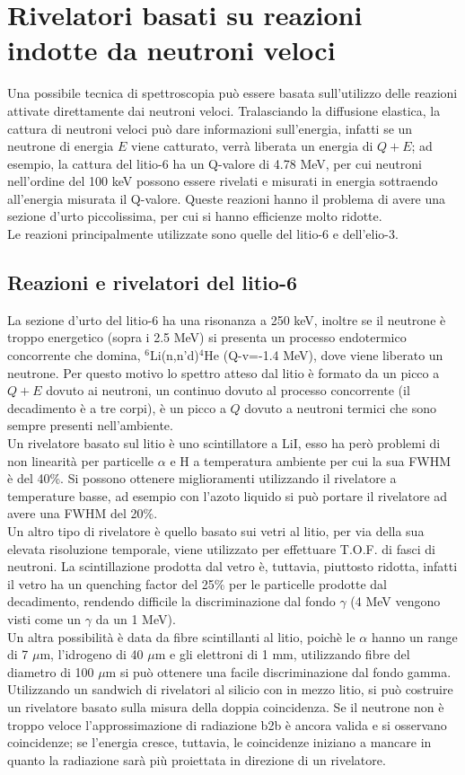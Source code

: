 \section{Rivelatori basati su reazioni indotte da neutroni veloci}
Una possibile tecnica di spettroscopia pu\`o essere basata sull'utilizzo delle reazioni attivate direttamente dai neutroni veloci.
Tralasciando la diffusione elastica, la cattura di neutroni veloci pu\`o dare informazioni sull'energia, infatti se un neutrone
di energia $E$ viene catturato, verr\`a liberata un energia di $Q+E$;
ad esempio, la cattura del litio-6 ha un Q-valore di 4.78 MeV, per cui neutroni nell'ordine del 100 keV possono essere rivelati
e misurati in energia sottraendo all'energia misurata il Q-valore.
Queste reazioni hanno il problema di avere una sezione d'urto piccolissima, per cui si hanno efficienze molto ridotte.\\
Le reazioni principalmente utilizzate sono quelle del litio-6 e dell'elio-3.
\subsection{Reazioni e rivelatori del litio-6}
La sezione d'urto del litio-6 ha una risonanza a 250 keV, inoltre se il neutrone \`e troppo energetico (sopra i 2.5 MeV) si presenta un 
processo endotermico concorrente che domina, $^6$Li(n,n'd)$^4$He (Q-v=-1.4 MeV), dove viene liberato un neutrone.
Per questo motivo lo spettro atteso dal litio \`e formato da un picco a $Q+E$ dovuto ai neutroni, un continuo dovuto al processo concorrente (il decadimento
\`e a tre corpi), \`e un picco a $Q$ dovuto a neutroni termici che sono sempre presenti nell'ambiente.\\
Un rivelatore basato sul litio \`e uno scintillatore a LiI, esso ha per\`o problemi di non linearit\`a per particelle $\alpha$ e H a temperatura ambiente
per cui la sua FWHM \`e del 40\%.
Si possono ottenere miglioramenti utilizzando il rivelatore a temperature basse, ad esempio con l'azoto liquido si pu\`o portare il rivelatore
ad avere una FWHM del 20\%.\\
Un altro tipo di rivelatore \`e quello basato sui vetri al litio, per via della sua elevata risoluzione temporale, viene utilizzato per effettuare
T.O.F. di fasci di neutroni. 
La scintillazione prodotta dal vetro \`e, tuttavia, piuttosto ridotta, infatti il vetro ha un quenching factor del 25\% per le particelle
prodotte dal decadimento, rendendo difficile la discriminazione dal fondo $\gamma$ (4 MeV vengono visti come un $\gamma$ da un 1 MeV).\\
Un altra possibilit\`a \`e data da fibre scintillanti al litio, poich\`e le $\alpha$ hanno un range di 7 $\mu$m, l'idrogeno di 40 $\mu$m e gli elettroni
di 1 mm, utilizzando fibre del diametro di 100 $\mu$m si pu\`o ottenere una facile discriminazione dal fondo gamma.\\
Utilizzando un sandwich di rivelatori al silicio con in mezzo litio, si pu\`o costruire un rivelatore basato sulla misura della doppia coincidenza.
Se il neutrone non \`e troppo veloce l'approssimazione di radiazione b2b \`e ancora valida e si osservano coincidenze;
se l'energia cresce, tuttavia, le coincidenze iniziano a mancare in quanto la radiazione sar\`a pi\`u proiettata in direzione di un rivelatore.
